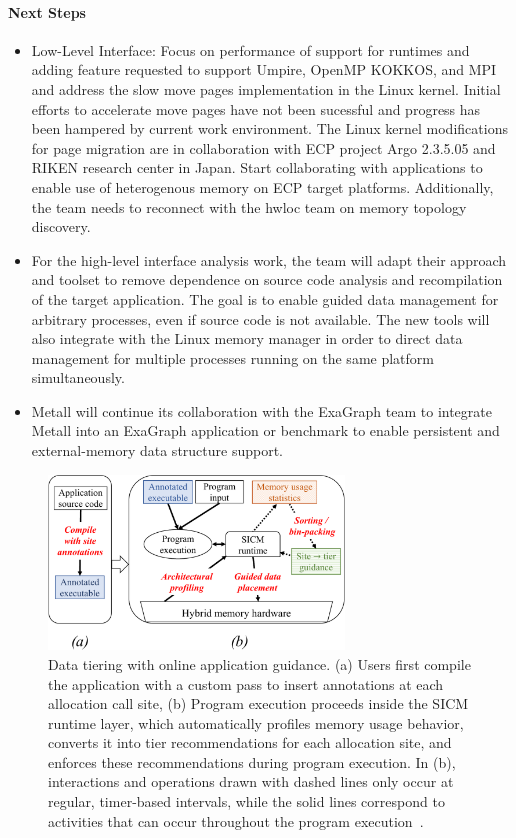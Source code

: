 \paragraph{Next Steps} \leavevmode 
\begin{itemize}
	\item  Low-Level Interface: Focus on performance of support for runtimes and adding feature requested to support Umpire, OpenMP KOKKOS, and MPI and address the slow move pages implementation in the Linux kernel. Initial efforts to accelerate move pages have not been sucessful and progress has been hampered by current work environment. The Linux kernel modifications for page migration are in collaboration with ECP project Argo 2.3.5.05 and RIKEN research center in Japan. Start collaborating with applications to enable use of heterogenous memory on ECP target platforms. Additionally, the team needs to reconnect with the hwloc team on memory topology discovery.
	\item For the high-level interface analysis work, the team will adapt their approach and toolset to remove dependence on source code analysis and recompilation of the target application. The goal is to enable guided data management for arbitrary processes, even if source code is not available. The new tools will also integrate with the Linux memory manager in order to direct data management for multiple processes running on the same platform simultaneously.
	\item Metall will continue its collaboration with the ExaGraph team to integrate Metall into an ExaGraph application or benchmark to enable persistent and external-memory data structure support.   
\end{itemize}

\begin{figure}[htb]
	\centering
	\includegraphics[width=0.7\textwidth]{projects/2.3.1-PMR/2.3.1.16-SICM/sicm-online-diagram.pdf}
	\caption{
		Data tiering with online application guidance. (a) Users first compile the application with a custom pass to insert annotations at each allocation call site, (b) Program execution proceeds inside the SICM runtime layer, which automatically profiles memory usage behavior, converts it into tier recommendations for each allocation site, and enforces these recommendations during program execution. In (b), interactions and operations drawn with dashed lines only occur at regular, timer-based intervals, while the solid lines correspond to activities that can occur throughout the program execution~\cite{olson2021online}.
		\label{fig:sicm-online}
	}
\end{figure}